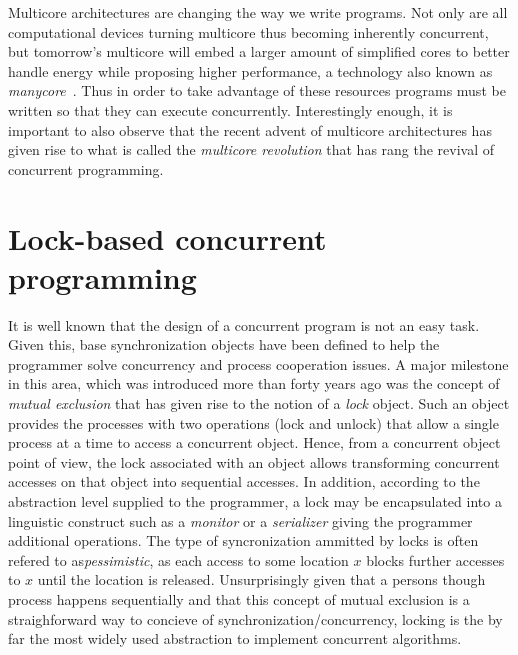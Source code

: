 







Multicore architectures are changing the way we write programs.
Not only are all computational devices
turning multicore thus becoming inherently concurrent, 
but tomorrow's multicore will embed a larger amount of simplified cores to better handle energy while 
proposing higher performance, a technology also known as \emph{manycore}~\cite{Borkar2007}.
Thus in order to take advantage of these resources programs must be written so
that they can execute concurrently.
Interestingly  enough,  
it is important to also observe that the recent advent of multicore 
architectures has  given rise to what is called the {\it multicore  
revolution} \cite{HL08} that has  rang the revival of concurrent programming. 


\section{Lock-based concurrent programming}
%
It is well known  that the design of a concurrent program is not an easy
task.
Given this, base synchronization objects have been defined to help 
the programmer solve  concurrency and process cooperation  issues. 
A  major milestone in this area, which was introduced 
more than forty years  ago was the concept of {\it mutual exclusion} \cite{D68}
that has given rise  to  the  notion of  a  {\it  lock} object.    Such an
object provides the processes with two operations (lock and unlock)
that  allow a single process at a time to access a concurrent object. 
Hence, from a  concurrent object point of view,   the  lock associated with
an object allows transforming  concurrent  accesses on  that object  
into sequential accesses.
In addition, according to the abstraction level
supplied to the programmer,  a lock may be encapsulated into a linguistic 
construct such as a {\it monitor} \cite{H74} or a {\it serializer} \cite{HA79}
giving the programmer additional operations.
The type of syncronization ammitted by locks is often refered to as\emph{pessimistic}, 
as each access to some location $x$ blocks further accesses to $x$ until the location is released.
Unsurprisingly given that
a persons though process happens sequentially
and that this concept of mutual exclusion is a straighforward way to
concieve of synchronization/concurrency,
locking is the by far the most widely used abstraction to
implement concurrent algorithms.


